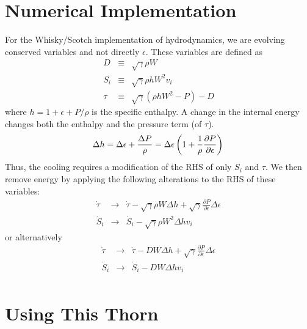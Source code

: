 \section{Numerical Implementation}

For the Whisky/Scotch implementation of hydrodynamics, we are evolving conserved variables
and not directly $\epsilon$.  These variables are defined as
\begin{subequations}
\begin{eqnarray}
    D &\equiv& \sqrt{\gamma} \rho W \\
    S_i &\equiv& \sqrt{\gamma} \rho h W^2 v_i \\
    \tau &\equiv& \sqrt{\gamma} \left( \rho h W^2 - P \right) - D
\end{eqnarray}
\end{subequations}
where $h = 1 + \epsilon + P/\rho$ is the specific enthalpy.  A change in the internal energy 
changes both the enthalpy and the pressure term (of $\tau$).
\begin{equation}
   \Delta h = \Delta \epsilon + \frac{\Delta P}{\rho} 
	= \Delta \epsilon \left( 1 + \frac{1}{\rho} \frac{\partial P}{\partial \epsilon} \right) \\
\end{equation}
Thus, the cooling requires a modification of the RHS of only $S_i$ and $\tau$.  We then remove
energy by applying the following alterations to the RHS of these variables:
\begin{subequations}
\begin{eqnarray}
   \dot{\tau} &\rightarrow& \dot{\tau} - \sqrt{\gamma} \rho W \Delta h + \sqrt{\gamma} \frac{\partial P}{\partial \epsilon} \Delta \epsilon \\
   \dot{S}_i &\rightarrow& \dot{S}_i - \sqrt{\gamma} \rho W^2 \Delta h v_i
\end{eqnarray}
\end{subequations}
or alternatively
\begin{subequations}
\begin{eqnarray}
   \dot{\tau} &\rightarrow& \dot{\tau} - D W \Delta h + \sqrt{\gamma} \frac{\partial P}{\partial \epsilon} \Delta \epsilon \\
   \dot{S}_i &\rightarrow& \dot{S}_i - D W \Delta h v_i \\
\end{eqnarray}
\end{subequations}

\section{Using This Thorn}

